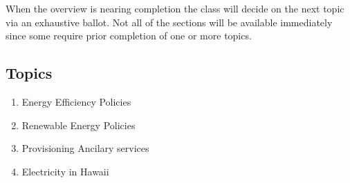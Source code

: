 \documentclass[letterpaper,10pt]{article}
\begin{document}
When the overview is nearing completion the class will decide on the next topic via an exhaustive ballot.  Not all of the sections will be available immediately since some require prior completion of one or more topics.

\subsection{Topics}

\begin{enumerate}
  \item Energy Efficiency Policies
  \item Renewable Energy Policies


  \item Provisioning Ancilary services
  \item Electricity in Hawaii
\end{enumerate}
\end{document}
